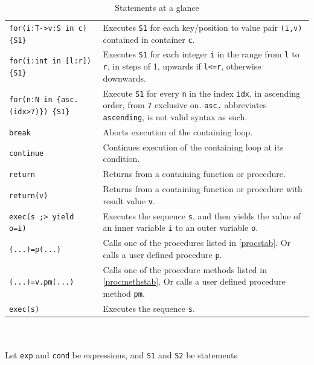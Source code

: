 \begin{table}[htbp]
\begin{minipage}{\linewidth}
\begin{tabularx}{\linewidth}{|lX|}
\texttt{for(i:T->v:S in c) \{S1\} } & Executes \texttt{S1} for each key/position to value pair \texttt{(i,v)} contained in container \texttt{c}.\\
\texttt{for(i:int in [l:r]) \{S1\} } & Executes \texttt{S1} for each integer \texttt{i} in the range from \texttt{l} to \texttt{r}, in steps of 1, upwards if \texttt{l<=r}, otherwise downwards.\\
\texttt{for(n:N in \{asc.(idx>7)\}) \{S1\}}	& Execute \texttt{S1} for every \texttt{n} in the index \texttt{idx}, in ascending order, from \texttt{7} exclusive on. \texttt{asc.} abbreviates \texttt{ascending}, is not valid syntax as such.\\
\hline
\texttt{break} & Aborts execution of the containing loop.\\
\texttt{continue} & Continues execution of the containing loop at its condition.\\
\texttt{return} & Returns from a containing function or procedure.\\
\texttt{return(v)} & Returns from a containing function or procedure with result value \texttt{v}.\\
\hline
\texttt{exec(s ;> yield o=i)} & Executes the sequence \texttt{s}, and then yields the value of an inner variable \texttt{i} to an outer variable \texttt{o}.\\
\hline
\texttt{(...)=p(...)}	& Calls one of the procedures listed in \ref{procstab}. Or calls a user defined procedure \texttt{p}.\\
\texttt{(...)=v.pm(...)}	& Calls one of the procedure methods listed in \ref{procmethstab}. Or calls a user defined procedure method \texttt{pm}.\\
\hline
\texttt{exec(s)} & Executes the sequence \texttt{s}.\\
\hline
\end{tabularx}
\end{minipage}\\
\\ 
{\small Let \texttt{exp} and \texttt{cond} be expressions, and \texttt{S1} and \texttt{S2} be statements}
\caption{Statements at a glance}
\label{statementstab}
\end{table}




